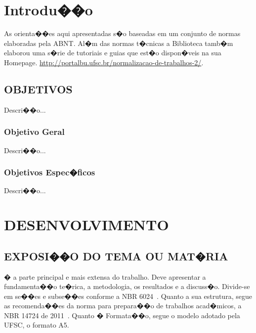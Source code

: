 \documentclass{ufscThesis} %
\begin{document}
\folhaderosto[comficha] %
\folhaaprovacao
\paginadedicatoria
\paginaagradecimento
\paginaepigrafe
\paginaresumo
\paginaabstract
\listadefiguras %
\listadetabelas 
\listadeabreviaturas
\listadesimbolos
\sumario

\chapter{Introdu��o}
As orienta��es aqui apresentadas s�o baseadas em um conjunto de normas elaboradas pela ABNT. Al�m das normas t�cnicas a Biblioteca tamb�m elaborou  uma s�rie de tutoriais e guias que est�o dispon�veis na sua Homepage. \url{http://portalbu.ufsc.br/normalizacao-de-trabalhos-2/}. 


\section{OBJETIVOS}

Descri��o...

\subsection{Objetivo Geral}

Descri��o...

\subsection{Objetivos Espec�ficos}

Descri��o...

\chapter{DESENVOLVIMENTO}

\section{EXPOSI��O DO TEMA OU MAT�RIA}

� a parte principal e mais extensa do trabalho. Deve apresentar a fundamenta��o te�rica, a metodologia, os resultados e a discuss�o. Divide-se em se��es e subse��es conforme a NBR 6024~\cite{abnt14724}. Quanto a sua estrutura, segue as recomenda��es da norma para prepara��o de trabalhos acad�micos, a NBR 14724 de 2011~\cite{abnt14724}. Quanto � Formata��o, segue o modelo adotado pela UFSC, o formato A5.
\end{document}
